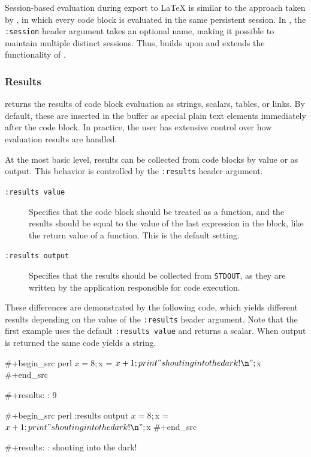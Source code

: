 \documentclass[article,shortnames]{jss}
\begin{document}
Session-based evaluation during export to \LaTeX{} is similar to the approach
taken by , in which every code block is evaluated in the same
persistent session.  In , the \texttt{:session} header argument takes
an optional name, making it possible to maintain multiple distinct
sessions.  Thus,  builds upon and extends the functionality of .
\subsubsection{Results}
\label{sec-3-2-3}

 returns the results of code block evaluation as strings,
scalars, tables, or links.  By default, these are
inserted in the  buffer as special plain text elements immediately after
the code block.  In practice, the user has extensive control over how
evaluation results are handled.

At the most basic level, results can be collected from code blocks by
value or as output.  This behavior is controlled by the \texttt{:results}
header argument.

\begin{description}
\item[\texttt{:results value}] Specifies that the code block should be treated
     as a function, and the results should be equal to the value of
     the last expression in the block, like the return value of a
     function.  This is the default setting.
\item[\texttt{:results output}] Specifies that the results should be collected
     from \texttt{STDOUT}, as they are written by the application responsible
     for code execution.
\end{description}

These differences are demonstrated by the following  code, which
yields different results depending on the value of the \texttt{:results}
header argument.  Note that the first example uses the default
\texttt{:results value} and returns a scalar.  When output is returned the
same code yields a string.


\begin{Code}
#+begin_src perl
  $x = 8;
  $x = $x + 1;
  print "shouting into the dark!\n";
  $x
#+end_src

#+results:
: 9

#+begin_src perl :results output
  $x = 8;
  $x = $x + 1;
  print "shouting into the dark!\n";
  $x
#+end_src

#+results:
: shouting into the dark!
\end{Code}
\end{document}

